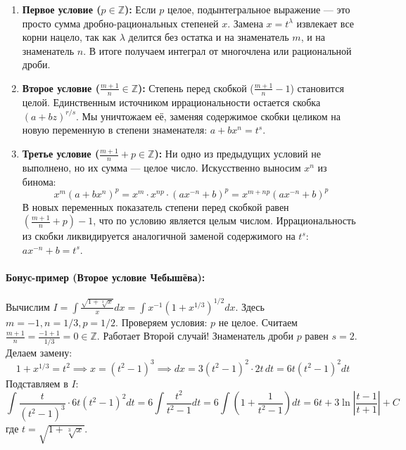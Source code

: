 \begin{enumerate}
    \item \textbf{Первое условие ($p \in \mathbb{Z}$):} 
    Если $p$ целое, подынтегральное выражение — это просто сумма дробно-рациональных степеней $x$. Замена $x = t^\lambda$ извлекает все корни нацело, так как $\lambda$ делится без остатка и на знаменатель $m$, и на знаменатель $n$. В итоге получаем интеграл от многочлена или рациональной дроби.
    
    \item \textbf{Второе условие ($\frac{m+1}{n} \in \mathbb{Z}$):} 
    Степень перед скобкой ($\frac{m+1}{n}-1$) становится целой. Единственным источником иррациональности остается скобка $(a+bz)^{r/s}$. Мы уничтожаем её, заменяя содержимое скобки целиком на новую переменную в степени знаменателя: $a+bx^n = t^s$.
    
    \item \textbf{Третье условие ($\frac{m+1}{n} + p \in \mathbb{Z}$):} 
    Ни одно из предыдущих условий не выполнено, но их сумма — целое число. Искусственно выносим $x^n$ из бинома: 
    $$x^m(a+bx^n)^p = x^m \cdot x^{np} \cdot (ax^{-n} + b)^p = x^{m+np}(ax^{-n}+b)^p$$
    В новых переменных показатель степени перед скобкой равен $(\frac{m+1}{n}+p)-1$, что по условию является целым числом. Иррациональность из скобки ликвидируется аналогичной заменой содержимого на $t^s$: $ax^{-n} + b = t^s$.
\end{enumerate}

\paragraph{Бонус-пример (Второе условие Чебышёва):}
Вычислим $I = \int \frac{\sqrt{1+\sqrt[3]{x}}}{x} dx = \int x^{-1}(1+x^{1/3})^{1/2} dx$.
Здесь $m = -1, n = 1/3, p = 1/2$. 
Проверяем условия: $p$ не целое. Считаем $\frac{m+1}{n} = \frac{-1+1}{1/3} = 0 \in \mathbb{Z}$. Работает Второй случай!
Знаменатель дроби $p$ равен $s=2$. Делаем замену: 
$$1 + x^{1/3} = t^2 \implies x = (t^2-1)^3 \implies dx = 3(t^2-1)^2 \cdot 2t \, dt = 6t(t^2-1)^2 dt$$
Подставляем в $I$:
$$ \int \frac{t}{(t^2-1)^3} \cdot 6t(t^2-1)^2 dt = 6 \int \frac{t^2}{t^2-1} dt = 6 \int \left(1 + \frac{1}{t^2-1}\right) dt = 6t + 3\ln\left|\frac{t-1}{t+1}\right| + C $$
где $t = \sqrt{1+\sqrt[3]{x}}$.

